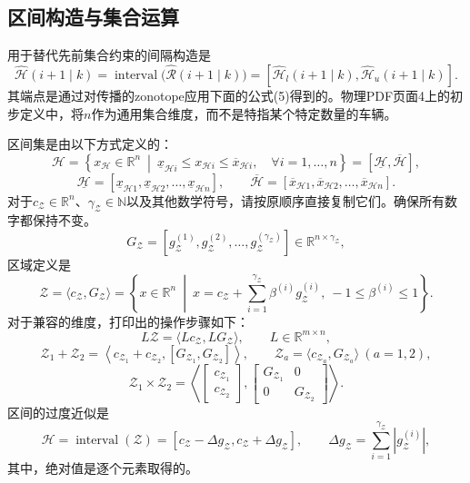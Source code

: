 \documentclass{article}
\begin{document}
\subsection*{区间构造与集合运算}
用于替代先前集合约束的间隔构造是
\begin{equation}
\hat{\mathcal{H}}(i+1\mid k)=\operatorname{interval}\bigl(\hat{\mathcal{R}}(i+1\mid k)\bigr)
=[\hat{\mathcal{H}}_l(i+1\mid k),\hat{\mathcal{H}}_u(i+1\mid k)]. \tag{49}
\end{equation}
其端点是通过对传播的zonotope应用下面的公式(5)得到的。物理PDF页面4上的初步定义中，将$n$作为通用集合维度，而不是特指某个特定数量的车辆。

区间集是由以下方式定义的：
\[
\mathcal{H}=\left\{x_{\mathcal{H}}\in\mathbb{R}^n\ \middle|\ \underline{x}_{\mathcal{H}i}\leq x_{\mathcal{H}i}\leq\overline{x}_{\mathcal{H}i},\quad\forall i=1,\ldots,n\right\}
=[\underline{\mathcal{H}},\overline{\mathcal{H}}],
\]
\[
\underline{\mathcal{H}}=[\underline{x}_{\mathcal{H}1},\underline{x}_{\mathcal{H}2},\ldots,\underline{x}_{\mathcal{H}n}],\qquad
\overline{\mathcal{H}}=[\overline{x}_{\mathcal{H}1},\overline{x}_{\mathcal{H}2},\ldots,\overline{x}_{\mathcal{H}n}].
\]
对于$c_{\mathcal{Z}}\in\mathbb{R}^n$、$\gamma_{\mathcal{Z}}\in\mathbb{N}$以及其他数学符号，请按原顺序直接复制它们。确保所有数字都保持不变。
\[
G_{\mathcal{Z}}=[g_{\mathcal{Z}}^{(1)},g_{\mathcal{Z}}^{(2)},\ldots,g_{\mathcal{Z}}^{(\gamma_{\mathcal{Z}})}]\in\mathbb{R}^{n\times\gamma_{\mathcal{Z}}},
\]
区域定义是
\begin{equation}
\mathcal{Z}=\langle c_{\mathcal{Z}},G_{\mathcal{Z}}\rangle
=\left\{x\in\mathbb{R}^n\ \middle|\ x=c_{\mathcal{Z}}+\sum_{i=1}^{\gamma_{\mathcal{Z}}}\beta^{(i)}g_{\mathcal{Z}}^{(i)},\ -1\leq\beta^{(i)}\leq1\right\}. \tag{3}
\end{equation}
对于兼容的维度，打印出的操作步骤如下：
\[
L\mathcal{Z}=\langle Lc_{\mathcal{Z}},LG_{\mathcal{Z}}\rangle,\qquad L\in\mathbb{R}^{m\times n},
\]
\[
\mathcal{Z}_1+\mathcal{Z}_2=\left\langle c_{\mathcal{Z}_1}+c_{\mathcal{Z}_2},[G_{\mathcal{Z}_1},G_{\mathcal{Z}_2}]\right\rangle,
\qquad \mathcal{Z}_a=\langle c_{\mathcal{Z}_a},G_{\mathcal{Z}_a}\rangle\ (a=1,2),
\]
\begin{equation}
\mathcal{Z}_1\times\mathcal{Z}_2=
\left\langle\begin{bmatrix}c_{\mathcal{Z}_1}\\c_{\mathcal{Z}_2}\end{bmatrix},
\begin{bmatrix}G_{\mathcal{Z}_1}&0\\0&G_{\mathcal{Z}_2}\end{bmatrix}\right\rangle. \tag{4}
\end{equation}
区间的过度近似是
\begin{equation}
\mathcal{H}=\operatorname{interval}(\mathcal{Z})=[c_{\mathcal{Z}}-\Delta g_{\mathcal{Z}},c_{\mathcal{Z}}+\Delta g_{\mathcal{Z}}],\qquad
\Delta g_{\mathcal{Z}}=\sum_{i=1}^{\gamma_{\mathcal{Z}}}|g_{\mathcal{Z}}^{(i)}|, \tag{5}
\end{equation}
其中，绝对值是逐个元素取得的。
\end{document}

